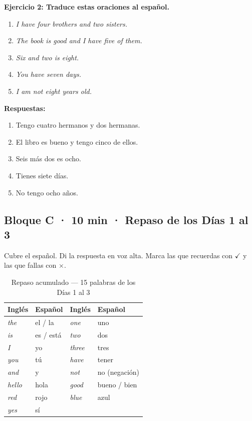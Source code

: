 \bigskip
\noindent
\textbf{Ejercicio 2: Traduce estas oraciones al español.}

\begin{enumerate}
  \item \textit{I have four brothers and two sisters.}
  \item \textit{The book is good and I have five of them.}
  \item \textit{Six and two is eight.}
  \item \textit{You have seven days.}
  \item \textit{I am not eight years old.}
\end{enumerate}

\medskip
\noindent
\textbf{Respuestas:}
\begin{enumerate}
  \item Tengo cuatro hermanos y dos hermanas.
  \item El libro es bueno y tengo cinco de ellos.
  \item Seis más dos es ocho.
  \item Tienes siete días.
  \item No tengo ocho años.
\end{enumerate}

\subsection*{Bloque C · 10 min · Repaso de los Días 1 al 3}

\noindent
Cubre el español. Di la respuesta en voz alta. Marca las que
recuerdas con $\checkmark$ y las que fallas con $\times$.

\begin{table}[htbp]
  \centering
  \caption{Repaso acumulado — 15 palabras de los Días 1 al 3}
  \label{tab:repaso_dia4}
  \small
  \begin{tabular}{@{}llll@{}}
    \toprule
    \textbf{Inglés} & \textbf{Español} &
    \textbf{Inglés} & \textbf{Español} \\
    \midrule
    \textit{the}   & el / la &
    \textit{one}   & uno \\
    \textit{is}    & es / está &
    \textit{two}   & dos \\
    \textit{I}     & yo &
    \textit{three} & tres \\
    \textit{you}   & tú &
    \textit{have}  & tener \\
    \textit{and}   & y &
    \textit{not}   & no (negación) \\
    \textit{hello} & hola &
    \textit{good}  & bueno / bien \\
    \textit{red}   & rojo &
    \textit{blue}  & azul \\
    \textit{yes}   & sí & & \\
    \bottomrule
  \end{tabular}
\end{table}

